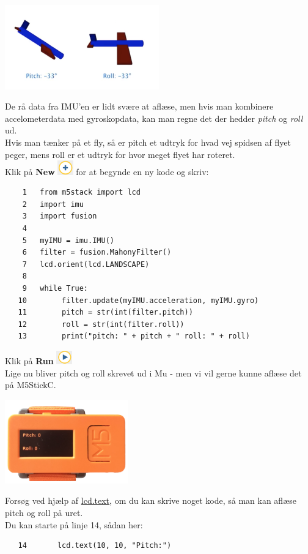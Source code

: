 \documentclass{ucph-handout}
\begin{document}
\begin{exercisebox}[adjusted title=Pitch og Roll]

\includegraphics[width=0.5\textwidth]{billeder/pitchroll.png}

De rå data fra IMU'en er lidt svære at aflæse, men hvis man kombinere accelometerdata med gyroskopdata, kan man regne det der hedder \textit{pitch} og \textit{roll} ud. \\
Hvis man tænker på et fly, så er pitch et udtryk for hvad vej spidsen af flyet peger, mens roll er et udtryk for hvor meget flyet har roteret. \\

Klik på \textbf{New} \includegraphics[width=0.05\textwidth]{ikoner/new.png} for at begynde en ny kode og skriv:

\begin{verbatim}
    1   from m5stack import lcd
    2   import imu
    3   import fusion
    4
    5   myIMU = imu.IMU()   
    6   filter = fusion.MahonyFilter()
    7   lcd.orient(lcd.LANDSCAPE)
    8
    9   while True:
   10        filter.update(myIMU.acceleration, myIMU.gyro)
   11        pitch = str(int(filter.pitch))
   12        roll = str(int(filter.roll))
   13        print("pitch: " + pitch + " roll: " + roll)
\end{verbatim}
Klik på \textbf{Run} \includegraphics[width=0.05\textwidth]{ikoner/run.png}\\

Lige nu bliver pitch og roll skrevet ud i Mu - men vi vil gerne kunne aflæse det på M5StickC.

\includegraphics[width=0.4\textwidth]{billeder/pitchrollbillede.png}

Forsøg ved hjælp af \url{lcd.text}, om du kan skrive noget kode, så man kan aflæse pitch og roll på uret. \\

Du kan starte på linje 14, sådan her:
\begin{verbatim}
   14       lcd.text(10, 10, "Pitch:")
\end{verbatim}

\end{exercisebox}
\end{document}
